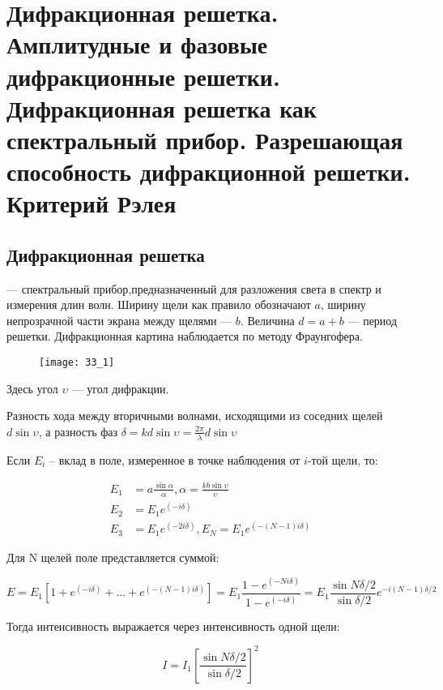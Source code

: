\section{Дифракционная решетка. Амплитудные и фазовые дифракционные решетки. Дифракционная решетка как спектральный прибор. Разрешающая способность дифракционной решетки. Критерий Рэлея}

\subsection{Дифракционная решетка}

 --- спектральный прибор,предназначенный для разложения света в спектр и измерения длин волн. Ширину щели как правило обозначают $a$, ширину непрозрачной части экрана между щелями --- $b$. Величина $d = a + b$ --- период решетки. Дифракционная картина наблюдается по методу Фраунгофера.

\begin{figure}[H]
	\centering
	\texttt{[image: 33\_1]}
\end{figure}

Здесь угол $\upsilon$ --- угол дифракции.

Разность хода между вторичными волнами, исходящими из соседних щелей $d\sin{\upsilon}$, а разность фаз $\delta = k d\sin{\upsilon}=\frac{2\pi}{\lambda}d\sin{\upsilon}$

Если $E_i$ -- вклад в поле, измеренное в точке наблюдения от $i$-той щели, то:

\begin{align*}
	E_1 &= a\frac{\sin{\alpha}}{\alpha}, \alpha = \frac{kb\sin{\upsilon}}{\upsilon}\\
	E_2 &= E_1 e^{(-i\delta)}\\
	E_3 &= E_1 e^{(-2i\delta)}, E_N = E_1 e^{(-(N-1)i\delta)}
\end{align*}

Для N щелей поле представляется суммой:

\begin{equation*}
	E = E_1[1+e^{(-i\delta)} + ... + e^{(-(N-1)i\delta)}] = E_1\frac{1-e^{(-Ni\delta)}}{1-e^{(-i\delta)}} = E_1\frac{\sin{N\delta/2}}{\sin{\delta/2}}e^{-i(N-1)\delta/2}
\end{equation*}

Тогда интенсивность выражается через интенсивность одной щели:

\begin{equation*}
	I = I_1[\frac{\sin{N\delta/2}}{\sin{\delta/2}}]^2
\end{equation*}

